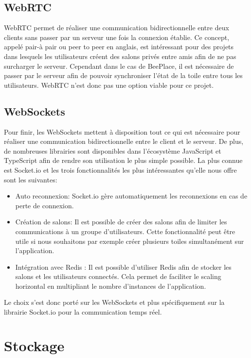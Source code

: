 \subsection{WebRTC}
WebRTC permet de réaliser une communication bidirectionnelle entre deux clients sans passer par un serveur une fois la connexion établie. Ce concept, appelé pair-à pair ou peer to peer en anglais, est intéressant pour des projets dans lesquels les utilisateurs créent des salons privés entre amis afin de ne pas surcharger le serveur. Cependant dans le cas de BeePlace, il est nécessaire de passer par le serveur afin de pouvoir synchroniser l'état de la toile entre tous les utilisateurs. WebRTC n'est donc pas une option viable pour ce projet.

\subsection{WebSockets}
Pour finir, les WebSockets mettent à disposition tout ce qui est nécessaire pour réaliser une communication bidirectionnelle entre le client et le serveur. De plus, de nombreuses librairies sont disponibles dans l'écosystème JavaScript et TypeScript afin de rendre son utilisation le plus simple possible. La plus connue est Socket.io et les trois fonctionnalités les plus intéressantes qu'elle nous offre sont les suivantes:

\begin{itemize}
  \item Auto reconnexion: Socket.io gère automatiquement les reconnexions en cas de perte de connexion.
  \item Création de salons: Il est possible de créer des salons afin de limiter les communications à un groupe d'utilisateurs. Cette fonctionnalité peut être utile si nous souhaitons par exemple créer plusieurs toiles simultanément sur l'application.
  \item Intégration avec Redis \cite{redis}: Il est possible d'utiliser Redis afin de stocker les salons et les utilisateurs connectés. Cela permet de faciliter le scaling horizontal en multipliant le nombre d'instances de l'application.
\end{itemize}

Le choix s'est donc porté sur les WebSockets et plus spécifiquement sur la librairie Socket.io pour la communication temps réel.

\section{Stockage}

